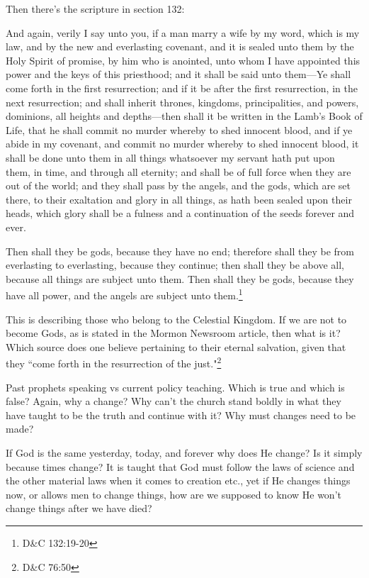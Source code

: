 Then there's the scripture in section 132:

\begin{displayquote}
And again, verily I say unto you, if a man marry a wife by my 
word, which is my law, and by the new and everlasting covenant, 
and it is sealed unto them by the Holy Spirit of promise, by him 
who is anointed, unto whom I have appointed this power and the keys
of this priesthood; and it shall be said unto them—Ye shall come 
forth in the first resurrection; and if it be after the first 
resurrection, in the next resurrection; and shall inherit thrones, 
kingdoms, principalities, and powers, dominions, all heights and 
depths—then shall it be written in the Lamb’s Book of Life, that 
he shall commit no murder whereby to shed innocent blood, and if 
ye abide in my covenant, and commit no murder whereby to shed innocent 
blood, it shall be done unto them in all things whatsoever my servant 
hath put upon them, in time, and through all eternity; and shall be of 
full force when they are out of the world; and they shall pass by the 
angels, and the gods, which are set there, to their exaltation and 
glory in all things, as hath been sealed upon their heads, which 
glory shall be a fulness and a continuation of the seeds 
forever and ever.

Then shall they be gods, because they have no end; therefore shall 
they be from everlasting to everlasting, because they continue; then 
shall they be above all, because all things are subject unto them. 
Then shall they be gods, because they have all power, and the 
angels are subject unto them.\footnote{D\&C 132:19-20}
\end{displayquote}

This is describing those who belong to the Celestial Kingdom. If we are not to
become Gods, as is stated in the Mormon Newsroom article, then what is it? Which
source does one believe pertaining to their eternal salvation, given that they
``come forth in the resurrection of the just."\footnote{D\&C 76:50} 

Past prophets speaking vs current policy teaching. Which is true and which is
false? Again, why a change? Why can't the church stand boldly in what they have
taught to be the truth and continue with it? Why must changes need to be made?

If God is the same yesterday, today, and forever why does He change? Is it
simply because times change? It is taught that God must follow the laws of
science and the other material laws when it comes to creation etc., yet if He
changes things now, or allows men to change things, how are we supposed to know
He won't change things after we have died?


